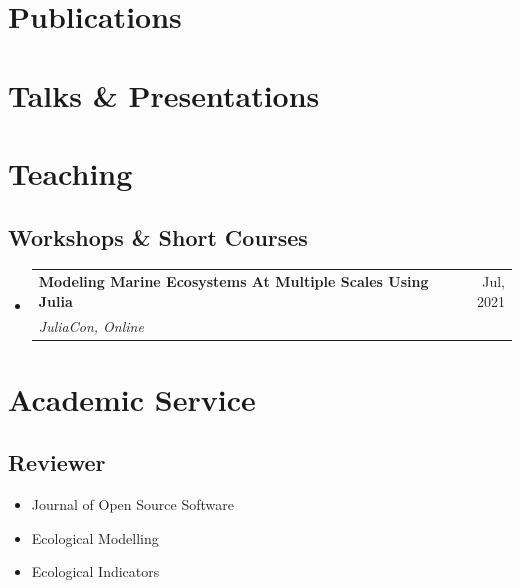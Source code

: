 \documentclass[letterpaper,11pt]{article}
\makeatletter
\newcommand{\resumeSubheading}[4]{
  \vspace{-1pt}\item
    \begin{tabular*}{0.97\textwidth}[t]{l@{\extracolsep{\fill}}r}
      \textbf{#1} & #2 \\
      \textit{#3} & \textit{#4} \\
    \end{tabular*}\vspace{-5pt}
}
\newcommand{\resumeSubHeadingListStart}{\begin{itemize}[leftmargin=*]}
\newcommand{\resumeSubHeadingListEnd}{\end{itemize}}
\makeatother
\begin{document}
\section{Publications}
\begin{refsection}
\nocite{*}

\printbibliography[heading={subbibliography},title=Submitted/Under Review, type = unpublished, prenote=mynote]
\printbibliography[heading={subbibliography},title=Peer Reviewed Papers, type = article]
\end{refsection}

\section{Talks \& Presentations}
\begin{refsection}
\nocite{*}
\printbibliography[heading={none}, type = inproceedings]
\end{refsection}
  

\section{Teaching}
  \subsection*{Workshops \& Short Courses}
    \resumeSubHeadingListStart
        \resumeSubheading
        {Modeling Marine Ecosystems At Multiple Scales Using Julia}{Jul, 2021}
        {JuliaCon, Online}{}
    \resumeSubHeadingListEnd

\section{Academic Service}
  \subsection*{Reviewer}
    \begin{itemize}
      \item Journal of Open Source Software
      \item Ecological Modelling
      \item Ecological Indicators
    \end{itemize}

\end{document}

